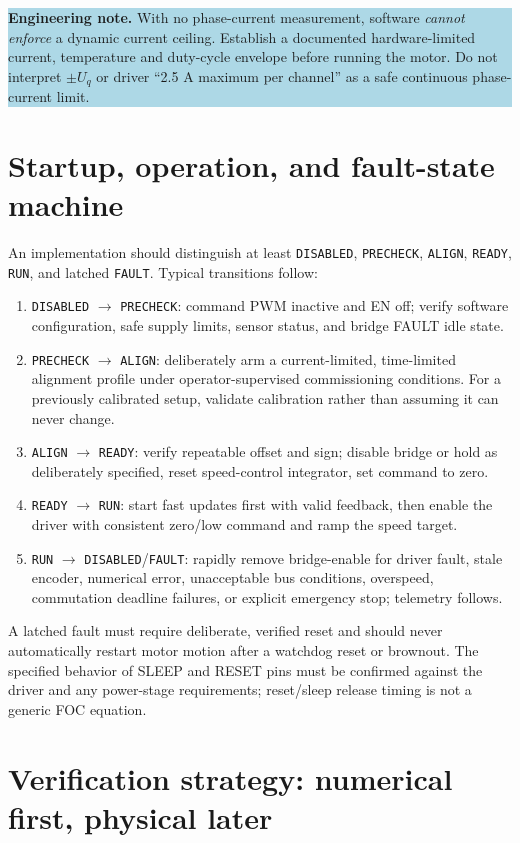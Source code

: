 \documentclass[10pt,letterpaper]{article}
\newcommand{\note}[1]{\par\medskip\noindent\colorbox{lightblue}{\parbox{0.965\linewidth}{\textbf{Engineering note.} #1}}\par\medskip}
\begin{document}
\note{With no phase-current measurement, software \emph{cannot enforce} a dynamic current ceiling. Establish a documented hardware-limited current, temperature and duty-cycle envelope before running the motor. Do not interpret $\pm U_q$ or driver ``2.5 A maximum per channel'' as a safe continuous phase-current limit.}

\section{Startup, operation, and fault-state machine}
An implementation should distinguish at least \texttt{DISABLED}, \texttt{PRECHECK}, \texttt{ALIGN}, \texttt{READY}, \texttt{RUN}, and latched \texttt{FAULT}. Typical transitions follow:
\begin{enumerate}
\item \texttt{DISABLED} $\rightarrow$ \texttt{PRECHECK}: command PWM inactive and EN off; verify software configuration, safe supply limits, sensor status, and bridge FAULT idle state.
\item \texttt{PRECHECK} $\rightarrow$ \texttt{ALIGN}: deliberately arm a current-limited, time-limited alignment profile under operator-supervised commissioning conditions. For a previously calibrated setup, validate calibration rather than assuming it can never change.
\item \texttt{ALIGN} $\rightarrow$ \texttt{READY}: verify repeatable offset and sign; disable bridge or hold as deliberately specified, reset speed-control integrator, set command to zero.
\item \texttt{READY} $\rightarrow$ \texttt{RUN}: start fast updates first with valid feedback, then enable the driver with consistent zero/low command and ramp the speed target.
\item \texttt{RUN} $\rightarrow$ \texttt{DISABLED}/\texttt{FAULT}: rapidly remove bridge-enable for driver fault, stale encoder, numerical error, unacceptable bus conditions, overspeed, commutation deadline failures, or explicit emergency stop; telemetry follows.
\end{enumerate}
A latched fault must require deliberate, verified reset and should never automatically restart motor motion after a watchdog reset or brownout. The specified behavior of SLEEP and RESET pins must be confirmed against the driver and any power-stage requirements; reset/sleep release timing is not a generic FOC equation.

\section{Verification strategy: numerical first, physical later}
\end{document}
